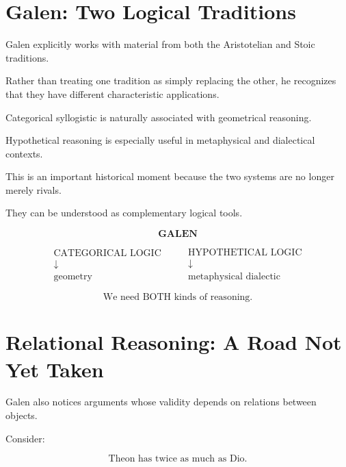 \documentclass[11pt]{article}
\begin{document}
\section{Galen: Two Logical Traditions}

Galen explicitly works with material from both the Aristotelian
and Stoic traditions.

Rather than treating one tradition as simply replacing the
other, he recognizes that they have different characteristic
applications.

Categorical syllogistic is naturally associated with geometrical
reasoning.

Hypothetical reasoning is especially useful in metaphysical and
dialectical contexts.

This is an important historical moment because the two systems are
no longer merely rivals.

They can be understood as complementary logical tools.

\begin{whiteboard}
\[
\textbf{GALEN}
\]

\[
\begin{array}{c}
\text{CATEGORICAL LOGIC}\\
\downarrow\\
\text{geometry}
\end{array}
\qquad
\begin{array}{c}
\text{HYPOTHETICAL LOGIC}\\
\downarrow\\
\text{metaphysical dialectic}
\end{array}
\]

\[
\boxed{\text{We need BOTH kinds of reasoning.}}
\]
\end{whiteboard}

\section{Relational Reasoning: A Road Not Yet Taken}

Galen also notices arguments whose validity depends on relations
between objects.

Consider:

\[
\text{Theon has twice as much as Dio.}
\]
\end{document}
